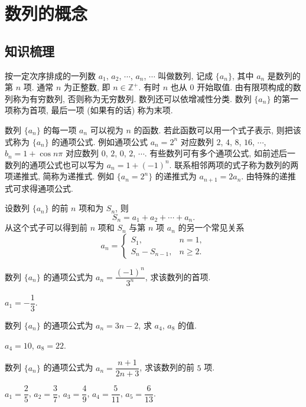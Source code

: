 
\section{数列的概念}

\subsection{知识梳理}
按一定次序排成的一列数 $a_1$, $a_2$, $\cdots$, $a_n$, $\cdots$ 叫做数列, 记成 $\{a_n\}$, 其中 $a_n$ 是数列的第 $n$ 项.
通常 $n$ 为正整数, 即 $n\in\mathbb{Z}^+$. 有时 $n$ 也从 $0$ 开始取值. 由有限项构成的数列称为有穷数列, 否则称为无穷数列. 数列还可以依增减性分类. 数列 $\{a_n\}$ 的第一项称为首项, 最后一项 (如果有的话) 称为末项.

数列 $\{a_n\}$ 的每一项 $a_n$ 可以视为 $n$ 的函数. 
若此函数可以用一个式子表示, 则把该式称为 $\{a_n\}$ 的通项公式.
例如通项公式 $a_n=2^n$ 对应数列 $2$, $4$, $8$, $16$, $\cdots$, 
$b_n= 1+\cos n\pi$ 对应数列 $0$, $2$, $0$, $2$, $\cdots$. 有些数列可有多个通项公式, 如前述后一数列的通项公式也可以写为 $a_n= 1+(-1)^n$. 联系相邻两项的式子称为数列的两项递推式, 简称为递推式. 例如 $\{a_n=2^n\}$ 的递推式为 $a_{n+1}= 2a_n$. 由特殊的递推式可求得通项公式. 

设数列 $\{a_n\}$ 的前 $n$ 项和为 $S_n$, 则
\[S_n=a_1+a_2+\cdots+a_n.\]
从这个式子可以得到前 $n$ 项和 $S_n$ 与第 $n$ 项 $a_n$ 的另一个常见关系
\[a_n=\begin{cases}
      S_1, & n=1,\\
      S_n-S_{n-1}, & n\geqslant 2.
    \end{cases}\]

\lianxi
\begin{exercise}
    数列 $\{a_n\}$ 的通项公式为 $a_n =\dfrac{(-1)^n}{3^n}$, 求该数列的首项.
\end{exercise}
\beginsolution
    $a_1= -\dfrac13$.
\endsolution

\begin{exercise}
    数列 $\{a_n\}$ 的通项公式为 $a_n =3n-2$, 求 $a_4$, $a_8$ 的值.
\end{exercise}
\beginsolution
    $a_4= 10$, $a_8= 22$.
\endsolution

\begin{exercise}
    数列 $\{a_n\}$ 的通项公式为 $a_n=\dfrac{n+1}{2n+3}$, 求该数列的前 $5$ 项.
\end{exercise}
\beginsolution
    $a_1= \dfrac25$, $a_2= \dfrac37$, $a_3= \dfrac49$, $a_4= \dfrac5{11}$, $a_5= \dfrac6{13}$.
\endsolution

